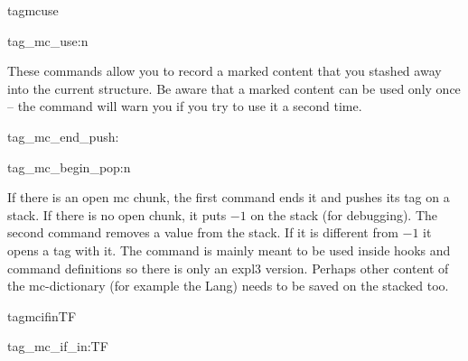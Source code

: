 \documentclass[DIV=12,parskip=half-,bibliography=totoc]{scrartcl}
\newcommand\PDF{PDF}
\begin{document}
%
%
%
%
%
%
%


\begin{docCommand}{tagmcuse}{}\end{docCommand}
\begin{docCommand}{tag_mc_use:n}{}\end{docCommand}


These commands allow you to record a marked content that you stashed away into the current structure. Be aware that a marked content can be used only once -- the command will warn you if you try to use it a second time.


\begin{docCommand}{tag_mc_end_push:}{}\end{docCommand}
\begin{docCommand}{tag_mc_begin_pop:n}{}\end{docCommand}

If there is an open mc chunk,
the first command ends it and pushes its tag on a stack. If there is no
open chunk, it puts $-1$ on the stack (for debugging).
The second command removes a value from the stack. If it is different from
$-1$ it opens a tag with it. The command is mainly meant to be used inside hooks and command
definitions so there is only an expl3 version. Perhaps other content of the mc-dictionary (for example the Lang) needs to be saved on the stacked too.



\begin{docCommand}{tagmcifinTF}{}\end{docCommand}
\begin{docCommand}{tag_mc_if_in:TF}{}\end{docCommand}
\end{document}
